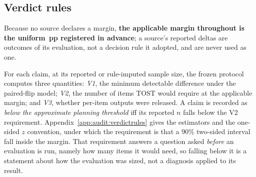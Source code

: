 \subsection{Verdict rules}
\label{sec:audit:rules}

Because no source declares a margin, \textbf{the applicable margin throughout is
the uniform \AuditMarginPP{}\,pp registered in advance}; a source's reported
deltas are outcomes of its evaluation, not a decision rule it adopted, and are
never used as one.

For each claim, at its reported or rule-imputed sample size, the frozen protocol
computes three quantities: \emph{V1}, the minimum detectable difference under
the paired-flip model; \emph{V2}, the number of items TOST would require at the
applicable margin; and \emph{V3}, whether per-item outputs were released. A
claim is recorded as \emph{below the approximate planning threshold} iff its
reported $n$ falls below the V2 requirement.
Appendix~\ref{app:audit:verdictrules} gives the estimators and the one-sided
$z$ convention, under which the requirement is that a 90\% two-sided interval
fall inside the margin.
That requirement answers a question asked \emph{before} an evaluation is run,
namely how many items it would need, so falling below it is a statement about
how the evaluation was sized, not a diagnosis applied to its result.

